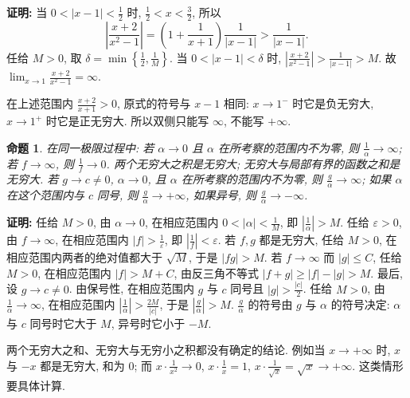 \documentclass[UTF8,openany]{ctexbook}
\theoremstyle{chinesetextbook}
\newtheorem{proposition}{命题}[section]
\newenvironment{cnproof}{\par\indent\textbf{证明:} \ignorespaces}{\par}
\begin{document}
\begin{cnproof}
当 $\displaystyle0<|x-1|<\frac12$ 时, $\displaystyle\frac12<x<\frac32$, 所以
\[
\left|\frac{x+2}{x^2-1}\right|=\left(1+\frac1{x+1}\right)\frac1{|x-1|}>\frac1{|x-1|}.
\]
任给 $M>0$, 取 $\displaystyle\delta=\min\left\{\frac12,\frac1M\right\}$. 当 $0<|x-1|<\delta$ 时, $\displaystyle\left|\frac{x+2}{x^2-1}\right|>\frac1{|x-1|}>M$. 故 $\displaystyle\lim_{x\to1}\frac{x+2}{x^2-1}=\infty$.
\end{cnproof}
在上述范围内 $\displaystyle\frac{x+2}{x+1}>0$, 原式的符号与 $x-1$ 相同: $x\to1^-$ 时它是负无穷大, $x\to1^+$ 时它是正无穷大. 所以双侧只能写 $\infty$, 不能写 $+\infty$.
\begin{proposition}
在同一极限过程中: 若 $\alpha\to0$ 且 $\alpha$ 在所考察的范围内不为零, 则 $\displaystyle\frac1\alpha\to\infty$; 若 $f\to\infty$, 则 $\displaystyle\frac1f\to0$. 两个无穷大之积是无穷大; 无穷大与局部有界的函数之和是无穷大. 若 $g\to c\ne0$, $\alpha\to0$, 且 $\alpha$ 在所考察的范围内不为零, 则 $\displaystyle\frac g\alpha\to\infty$; 如果 $\alpha$ 在这个范围内与 $c$ 同号, 则 $\displaystyle\frac g\alpha\to+\infty$, 如果异号, 则 $\displaystyle\frac g\alpha\to-\infty$.
\end{proposition}
\begin{cnproof}
任给 $M>0$, 由 $\alpha\to0$, 在相应范围内 $\displaystyle0<|\alpha|<\frac1M$, 即 $\displaystyle\left|\frac1\alpha\right|>M$. 任给 $\varepsilon>0$, 由 $f\to\infty$, 在相应范围内 $\displaystyle|f|>\frac1\varepsilon$, 即 $\displaystyle\left|\frac1f\right|<\varepsilon$. 若 $f,g$ 都是无穷大, 任给 $M>0$, 在相应范围内两者的绝对值都大于 $\sqrt M$, 于是 $|fg|>M$. 若 $f\to\infty$ 而 $|g|\le C$, 任给 $M>0$, 在相应范围内 $|f|>M+C$, 由反三角不等式 $|f+g|\ge|f|-|g|>M$. 最后, 设 $g\to c\ne0$. 由保号性, 在相应范围内 $g$ 与 $c$ 同号且 $\displaystyle|g|>\frac{|c|}2$. 任给 $M>0$, 由 $\displaystyle\frac1\alpha\to\infty$, 在相应范围内 $\displaystyle\left|\frac1\alpha\right|>\frac{2M}{|c|}$, 于是 $\displaystyle\left|\frac g\alpha\right|>M$. $\displaystyle\frac g\alpha$ 的符号由 $g$ 与 $\alpha$ 的符号决定: $\alpha$ 与 $c$ 同号时它大于 $M$, 异号时它小于 $-M$.
\end{cnproof}
两个无穷大之和、无穷大与无穷小之积都没有确定的结论. 例如当 $x\to+\infty$ 时, $x$ 与 $-x$ 都是无穷大, 和为 $0$; 而 $\displaystyle x\cdot\frac1{x^2}\to0$, $\displaystyle x\cdot\frac1x=1$, $\displaystyle x\cdot\frac1{\sqrt x}=\sqrt x\to+\infty$. 这类情形要具体计算.
\end{document}
